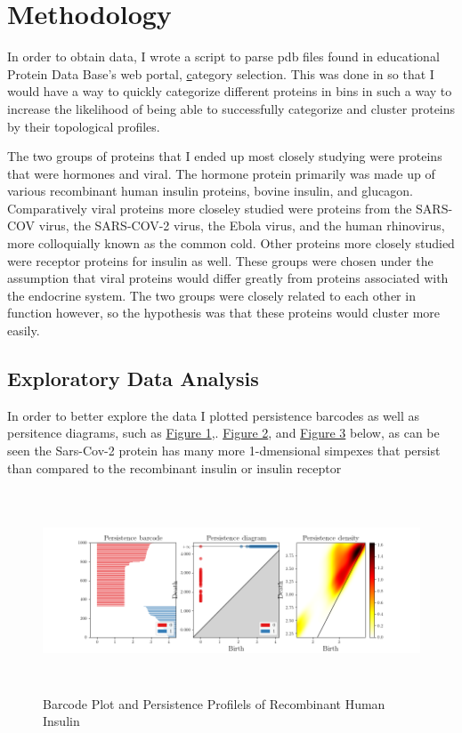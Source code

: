 \documentclass[12pt]{article}
\begin{document}
    \section{Methodology}
        \label{sec:methodology}
        In order to obtain data, I wrote a script to parse pdb files found in educational Protein Data Base's web portal, 
        \href{https://pdb101.rcsb.org/} category selection. This was done in so that I would have a way to quickly categorize different proteins 
        in bins in such a way to increase the likelihood of being able to successfully categorize and cluster proteins by their topological 
        profiles. 
        
        The two groups of proteins that I ended up most closely studying were proteins that were hormones and viral. The hormone protein primarily
        was made up of various recombinant human insulin proteins, bovine insulin, and glucagon. Comparatively viral proteins more closeley 
        studied were proteins from the SARS-COV virus, the SARS-COV-2 virus, the Ebola virus, and the human rhinovirus, more colloquially known 
        as the common cold. Other proteins more closely studied were receptor proteins for insulin as well. These groups were chosen under the assumption
        that viral proteins would differ greatly from proteins associated with the endocrine system. The two groups were closely related to each other
        in function however, so the hypothesis was that these proteins would cluster more easily.

        \subsection{Exploratory Data Analysis}
            \label{subsec:eda}
            In order to better explore the data I plotted persistence barcodes as well as persitence diagrams, such as \hyperref[fig:1]{Figure 1},.
            \hyperref[fig:2]{Figure 2}, and \hyperref[fig:3]{Figure 3} below, as can be seen the Sars-Cov-2 protein has many more 1-dmensional 
            simpexes that persist than compared to the recombinant insulin or insulin receptor

            \begin{figure}[H]
                \centering
                \includegraphics[height=6cm]{figures/1IR3.png}%
                \caption{Barcode Plot and Persistence Profilels of Recombinant Human Insulin}%
                \label{fig:1}
            \end{figure}
\end{document}
